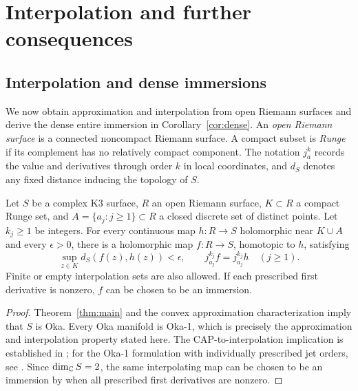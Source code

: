 \section{Interpolation and further consequences}
\label{sec:dense-entire}

\subsection{Interpolation and dense immersions}

We now obtain approximation and interpolation from open Riemann
surfaces and derive the dense entire immersion in
Corollary~\ref{cor:dense}.  An \emph{open Riemann surface} is a
connected noncompact Riemann surface.  A compact subset is
\emph{Runge} if its complement has no relatively compact component.
The notation $j_a^k$ records the value and derivatives through order
$k$ in local coordinates, and $d_S$ denotes any fixed distance
inducing the topology of $S$.

\begin{corollary}\label{cor:oka1}
Let $S$ be a complex K3 surface, $R$ an open
Riemann surface, $K\subset R$ a compact Runge set, and
$A=\{a_j:j\geq1\}\subset R$ a closed discrete set of distinct points.
Let $k_j\geq1$ be integers.  For every continuous map $h:R\to S$
holomorphic near $K\cup A$ and every $\epsilon>0$, there is a
holomorphic map $f:R\to S$, homotopic to $h$, satisfying
\[
 \sup_{z\in K}d_S(f(z),h(z))<\epsilon,
 \qquad j_{a_j}^{k_j}f=j_{a_j}^{k_j}h\quad(j\geq1).
\]
Finite or empty interpolation sets are also allowed.  If each
prescribed first derivative is nonzero, $f$ can be chosen to be an
immersion.
\end{corollary}

\begin{proof}
Theorem~\ref{thm:main} and the convex approximation characterization
\cite[Theorem~0.1]{ForstnericCAP} imply that $S$ is Oka.  Every Oka manifold is
Oka-1, which is precisely the approximation and interpolation
property stated here. The CAP-to-interpolation implication is
established in \cite[Corollary~1.3]{ForstnericInterpolation}; for the
Oka-1 formulation with individually prescribed jet orders, see \cite[Definition~1.1 and the following
discussion]{AlarconForstneric}.  Since $\dim_{\mathbb C}S=2$, the same
interpolating map can be chosen to be an immersion by
\cite[Corollary~2.10]{AlarconForstneric} when all prescribed first
derivatives are nonzero.
\end{proof}

